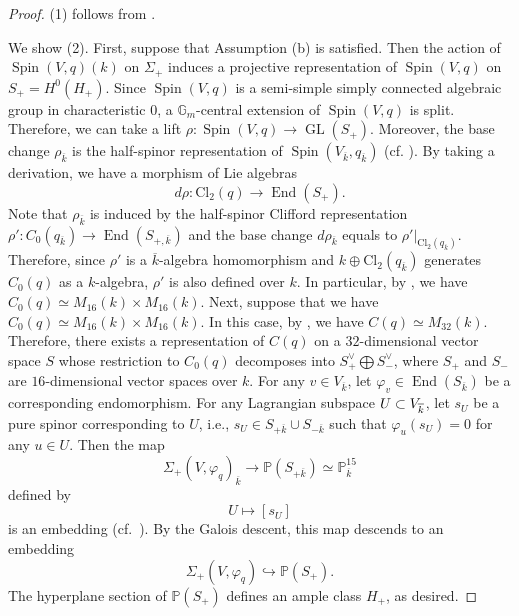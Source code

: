 \documentclass[autodetect-engine, a4paper]{amsart}
\theoremstyle{definition}
\def\G{{\mathbb G}}
\def\P{{\mathbb P}}
\DeclareMathOperator\GL{\mathrm{GL}}
\DeclareMathOperator{\Spin}{\mathrm{Spin}}
\DeclareMathOperator\End{\mathrm{End}}
\newcommand{\cred}{\color{black}}
\newcommand{\cora}{\color{black}}
\begin{document}
\begin{proof}
(1) follows from \cite[p.366, footnote]{Wang}.

We show (2).
First, suppose that Assumption (b) is satisfied.
{\cora Then the action of $\Spin (V, q) (k)$ on $\Sigma_{+}$ induces a projective representation of 
$\Spin (V,q)$ on $S_{+} = H^0 (H_{+})$. 
Since $\Spin (V,q)$ is a semi-simple simply connected algebraic group in characteristic $0$, a $\G_{m}$-central extension of $\Spin (V,q)$ is split.
Therefore, we can take a lift $\rho \colon \Spin (V,q) \rightarrow \GL (S_{+})$.
Moreover, the base change $\rho_{\overline{k}}$ is the half-spinor representation of $\Spin (V_{\overline{k}}, q_{\overline{k}})$ (cf. \cite[Section 1]{Mukaicurve}).
By taking a derivation, we have a morphism of Lie algebras
\[
d \rho \colon \mathrm{Cl}_{2} (q) \rightarrow \End (S_{+}).
\]
Note that $\rho_{\overline{k}}$ is induced by the half-spinor Clifford representation $\rho' \colon C_{0}(q_{\overline{k}}) \rightarrow \End (S_{+, \overline{k}})$ and the base change $d\rho_{\overline{k}}$ equals to $\rho'|_{\mathrm{Cl}_{2} (q_{\overline{k}})}$.
Therefore, since $\rho'$ is a $\overline{k}$-algebra homomorphism and $k \oplus \mathrm{Cl}_{2}(q_{\overline{k}})$ generates $C_{0} (q)$ as a $k$-algebra, $\rho'$ is also defined over $k$.
}
In particular, by \cite[Chapter V, Theorem 2.5]{Lam}, we have $C_{0} (q) \simeq M_{16} (k) \times M_{16} (k).$
Next, suppose that we have $C_{0} (q) \simeq M_{16} (k) \times M_{16} (k).$
In this case, by \cite[Chapter V, Theorem 2.5]{Lam}, we have
$C(q) \simeq M_{32} (k) $.
Therefore, there exists a representation of $C(q)$ on a $32$-dimensional vector space $S$ whose restriction to $C_{0} (q)$ decomposes into $S_{+}^{\vee} \bigoplus S_{-}^{\vee}$, where $S_{+}$ and $S_{-}$ are $16$-dimensional vector spaces over $k$.
For any $v \in V_{\overline{k}}$, let $\varphi_{v} \in \End (S_{\overline{k}})$ be a corresponding endomorphism.
For any Lagrangian subspace $U \subset V_{{\cred \overline{k}}}$, 
let $s_{U}$ be a pure spinor corresponding to $U$, i.e., $s_{U}\in S_{+ \overline{k}} \cup S_{- \overline{k}}$ such that $\varphi_{u} (s_{U}) =0$ for any $u \in U.$
Then the map
\[
\Sigma_{+}(V,\varphi_{q})_{\overline{k}} \rightarrow \P (S_{+ \overline{k}})\simeq \P^{15}_{\overline{k}}
\]
defined by
\[
U \mapsto [s_{U}]
\]
is an embedding (cf.\ \cite[Section 1]{Mukaicurve}).
By the Galois descent, this map descends to an embedding
\[
\Sigma_{+} (V,\varphi_q) \hookrightarrow \P (S_{+}).
\]
The hyperplane section of $\P (S_{+})$ defines an ample class $H_{+}$, as desired.
\end{proof}
\end{document}
